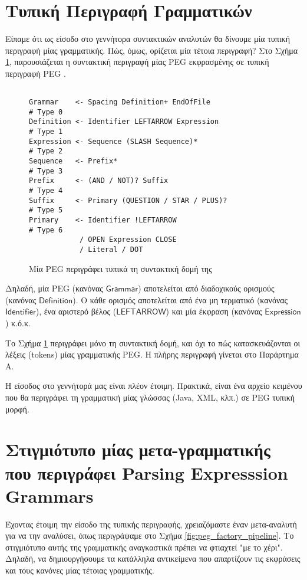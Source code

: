 \section{Τυπική Περιγραφή Γραμματικών}
Είπαμε ότι ως είσοδο στο γεννήτορα συντακτικών αναλυτών θα δίνουμε μία τυπική περιγραφή μίας γραμματικής.
Πώς, όμως, ορίζεται μία τέτοια περιγραφή? Στο Σχήμα \ref{fig:peg_specification}, παρουσιάζεται η συντακτική περιγραφή μίας PEG εκφρασμένης σε τυπική περιγραφή PEG \cite{lgi}.

\begin{figure}[h]
\begin{Verbatim}

Grammar    <- Spacing Definition+ EndOfFile                     # Type 0
Definition <- Identifier LEFTARROW Expression                   # Type 1
Expression <- Sequence (SLASH Sequence)*                        # Type 2
Sequence   <- Prefix*                                           # Type 3
Prefix     <- (AND / NOT)? Suffix                               # Type 4
Suffix     <- Primary (QUESTION / STAR / PLUS)?                 # Type 5
Primary    <- Identifier !LEFTARROW                             # Type 6
            / OPEN Expression CLOSE
            / Literal / DOT
\end{Verbatim}
\caption{Μία PEG περιγράφει τυπικά τη συντακτική δομή της}
\label{fig:peg_specification}
\end{figure}

Δηλαδή, μία PEG (κανόνας $\mathsf{Grammar}$) αποτελείται από διαδοχικούς ορισμούς (κανόνας $\mathsf{Definition}$).
Ο κάθε ορισμός αποτελείται από ένα μη τερματικό (κανόνας $\mathsf{Identifier}$), ένα αριστερό βέλος ($\mathsf{LEFTARROW}$) και μία έκφραση (κανόνας $\mathsf{Expression}$) κ.ό.κ.

Το Σχήμα \ref{fig:peg_specification} περιγράφει μόνο τη συντακτική δομή, και όχι το πώς κατασκευάζονται οι λέξεις (tokens) μίας γραμματικής PEG.
H πλήρης περιγραφή γίνεται στο Παράρτημα Α.

Η είσοδος στο γεννήτορά μας είναι πλέον έτοιμη.
Πρακτικά, είναι ένα αρχείο κειμένου που θα περιγράφει τη γραμματική μίας γλώσσας (Java, XML, κλπ.) σε PEG τυπική μορφή.

\section{Στιγμιότυπο μίας μετα-γραμματικής που περιγράφει Parsing Expresssion Grammars}

Έχοντας έτοιμη την είσοδο της τυπικής περιγραφής, χρειαζόμαστε έναν μετα-αναλυτή για να την αναλύσει, όπως περιγράψαμε στο Σχήμα \ref{fig:peg_factory_pipeline}.
Το στιγμιότυπο αυτής της γραμματικής αναγκαστικά πρέπει να φτιαχτεί "με το χέρι".
Δηλαδή, να δημιουργήσουμε τα κατάλληλα αντικείμενα που απαρτίζουν τις εκφράσεις και τους κανόνες μίας τέτοιας γραμματικής.

